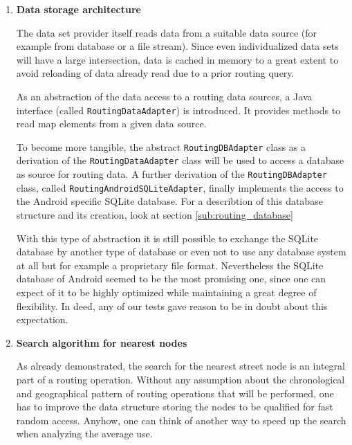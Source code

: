 \begin{enumerate}
	\item \textbf{Data storage architecture}

The data set provider itself reads data from a suitable data source (for example from database or a file stream). Since even individualized data sets will have a large intersection, data is cached in memory to a great extent to avoid reloading of data already read due to a prior routing query.\newline

As an abstraction of the data access to a routing data sources, a Java interface (called \texttt{RoutingDataAdapter}) is introduced. It provides methods to read map elements from a given data source.\newline

To become more tangible, the abstract \texttt{RoutingDBAdapter} class as a derivation of the \texttt{RoutingDataAdapter} class will be used to access a database as source for routing data. A further derivation of the \texttt{RoutingDBAdapter} class, called \texttt{RoutingAndroidSQLiteAdapter}, finally implements the access to the Android specific SQLite database. For a describtion of this database structure and its creation, look at section \ref{sub:routing_database}\newline

With this type of abstraction it is still possible to exchange the SQLite database by another type of database or even not to use any database system at all but for example a proprietary file format. Nevertheless the SQLite database of Android seemed to be the most promising one, since one can expect of it to be highly optimized while maintaining a great degree of flexibility. In deed, any of our tests gave reason to be in doubt about this expectation.

	\item \textbf{Search algorithm for nearest nodes}

As already demonstrated, the search for the nearest street node is an integral part of a routing operation. Without any assumption about the chronological and geographical pattern of routing operations that will be performed, one has to improve the data structure storing the nodes to be qualified for fast random access. Anyhow, one can think of another way to speed up the search when analyzing the average use.\newline


\end{enumerate}
